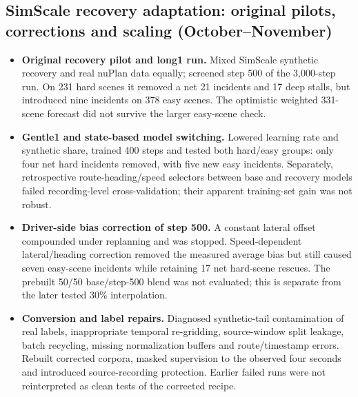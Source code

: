 \subsection{SimScale recovery adaptation: original pilots, corrections and scaling (October--November)}
\begin{itemize}\setlength{\itemsep}{3pt}\setlength{\parsep}{0pt}\setlength{\parskip}{0pt}\setlength{\topsep}{3pt}
\item \textbf{Original recovery pilot and long1 run.} Mixed SimScale \cite{simscale} synthetic recovery and real nuPlan data equally; screened step 500 of the 3,000-step run. On 231 hard scenes it removed a net 21 incidents and 17 deep stalls, but introduced nine incidents on 378 easy scenes. The optimistic weighted 331-scene forecast did not survive the larger easy-scene check.
\item \textbf{Gentle1 and state-based model switching.} Lowered learning rate and synthetic share, trained 400 steps and tested both hard/easy groups: only four net hard incidents removed, with five new easy incidents. Separately, retrospective route-heading/speed selectors between base and recovery models failed recording-level cross-validation; their apparent training-set gain was not robust.
\item \textbf{Driver-side bias correction of step 500.} A constant lateral offset compounded under replanning and was stopped. Speed-dependent lateral/heading correction removed the measured average bias but still caused seven easy-scene incidents while retaining 17 net hard-scene rescues. The prebuilt 50/50 base/step-500 blend was not evaluated; this is separate from the later tested 30\% interpolation.
\item \textbf{Conversion and label repairs.} Diagnosed synthetic-tail contamination of real labels, inappropriate temporal re-gridding, source-window split leakage, batch recycling, missing normalization buffers and route/timestamp errors. Rebuilt corrected corpora, masked supervision to the observed four seconds and introduced source-recording protection. Earlier failed runs were not reinterpreted as clean tests of the corrected recipe.

\end{itemize}
